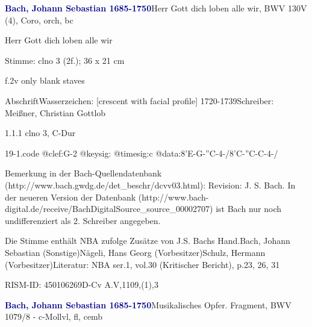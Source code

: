 \documentclass[a4paper, twocolumn, 11pt]{book}
\begin{document}
\par \vspace{16pt} \textcolor{darkblue}{\textbf{Bach, Johann Sebastian  1685-1750}}\hfillplus{[19]}\newline Herr Gott dich loben alle wir, BWV 130\newline V (4), Coro, orch, bc
\par \begin{itshape} Herr Gott dich loben alle wir\end{itshape} 
\par \textcolor{darkblue}{}  Stimme: clno 3  (2f.); 36 x 21 cm\newline \begin{small} f.2v only blank staves\end{small} \newline Abschrift\newline Wasserzeichen: [crescent with facial profile]  1720-1739\newline Schreiber: Meißner, Christian Gottlob
\par 1.1.1  clno 3, C-Dur  
\begin{filecontents*}{19-1.code}
@clef:G-2
@keysig:
@timesig:c
@data:8'E-G-''C-4-/8'C-''C-C-4-/
\end{filecontents*}
\newline %
\par Bemerkung in der Bach-Quellendatenbank (http://www.bach.gwdg.de/det\_beschr/dcvv03.html): {\textquotedbl}Revision: J. S. Bach{\textquotedbl}. In der neueren Version der Datenbank (http://www.bach-digital.de/receive/BachDigitalSource\_source\_00002707) ist Bach nur noch undifferenziert als 2. Schreiber angegeben.
\par Die Stimme enthält NBA zufolge Zusätze von J.S. Bachs Hand.\newline Bach, Johann Sebastian  (Sonstige)\newline Nägeli, Hans Georg  (Vorbesitzer)\newline Schulz, Hermann  (Vorbesitzer)\newline Literatur: NBA  ser.1, vol.30 (Kritischer Bericht), p.23, 26, 31
\par RISM-ID: 450106269\newline D-Cv  A.V,1109,(1),3
\par \vspace{16pt} \textcolor{darkblue}{\textbf{Bach, Johann Sebastian  1685-1750}}\hfillplus{[20]}\newline Musikalisches Opfer. Fragment, BWV 1079/8 - c-Moll\newline vl, fl, cemb
\end{document}
